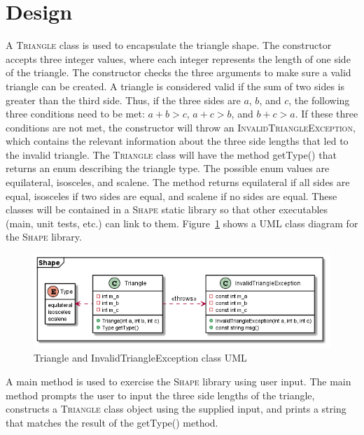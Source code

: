 \documentclass[letterpaper]{article}
\begin{document}

\section{Design}
A \textsc{Triangle} class is used to encapsulate the triangle shape. The constructor accepts three integer values, where each integer represents the length of one side of the triangle. The constructor checks the three arguments to make sure a valid triangle can be created. A triangle is considered valid if the sum of two sides is greater than the third side. Thus, if the three sides are $a$, $b$, and $c$, the following three conditions need to be met: $a + b > c$, $a + c > b$, and $b + c > a$. If these three conditions are not met, the constructor will throw an \textsc{InvalidTriangleException}, which contains the relevant information about the three side lengths that led to the invalid triangle. The \textsc{Triangle} class will have the method getType() that returns an enum describing the triangle type. The possible enum values are equilateral, isosceles, and scalene. The method returns equilateral if all sides are equal, isosceles if two sides are equal, and scalene if no sides are equal. These classes will be contained in a \textsc{Shape} static library so that other executables (main, unit tests, etc.) can link to them. Figure~\ref{fig:triangle} shows a UML class diagram for the \textsc{Shape} library.

\begin{figure}[H]
    \centering
    \includegraphics[scale=0.7]{figures/classdiagram.png}
    \caption{Triangle and InvalidTriangleException class UML}
    \label{fig:triangle}
\end{figure}

A main method is used to exercise the \textsc{Shape} library using user input. The main method prompts the user to input the three side lengths of the triangle, constructs a \textsc{Triangle} class object using the supplied input, and prints a string that matches the result of the getType() method.
\end{document}
